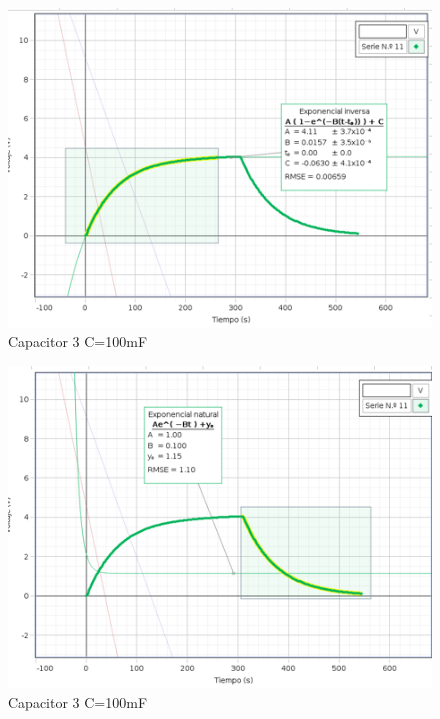 \documentclass{article}
\begin{document}
\begin{figure}[H]
   \centering 
   \includegraphics[scale=0.5]{../imgs/r4.png}
   \caption{Capacitor 3 C=100mF}
   \label{Fig:5}
\end{figure}

\begin{figure}[H]
   \centering 
   \includegraphics[scale=0.5]{../imgs/r5.png}
   \caption{Capacitor 3 C=100mF}
   \label{Fig:6}
\end{figure}
\end{document}
